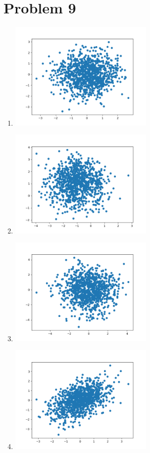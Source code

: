 \documentclass[11pt]{article}
\begin{document}
\pagebreak

\section{Problem 9}

\begin{enumerate}
      \item \includegraphics[width=7cm]{img/hw0/mpl_a}
      \item \includegraphics[width=7cm]{img/hw0/mpl_b}
      \item \includegraphics[width=7cm]{img/hw0/mpl_c}
      \item \includegraphics[width=7cm]{img/hw0/mpl_d}

\end{enumerate}
\end{document}
